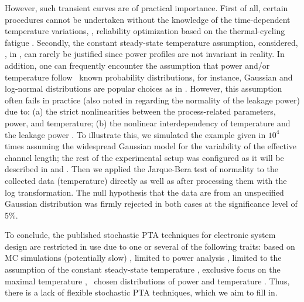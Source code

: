 However, such transient curves are of practical importance.
First of all, certain procedures cannot be undertaken without the knowledge of the time-dependent temperature variations, \eg, reliability optimization based on the thermal-cycling fatigue \cite{ukhov2012}.
Secondly, the constant steady-state temperature assumption, considered, \eg, in \cite{juan2011, juan2012}, can rarely be justified since power profiles are not invariant in reality.
In addition, one can frequently encounter the assumption that power and/or temperature follow \apriori\ known probability distributions, for instance, Gaussian and log-normal distributions are popular choices as in \cite{srivastava2010, juan2012, bhardwaj2006}.
However, this assumption often fails in practice (also noted in \cite{juan2012} regarding the normality of the leakage power) due to: (a) the strict nonlinearities between the process-related parameters, power, and temperature; (b) the nonlinear interdependency of temperature and the leakage power \cite{liu2007}.
To illustrate this, we simulated the example given in  $10^4$ times assuming the widespread Gaussian model for the variability of the effective channel length; the rest of the experimental setup was configured as it will be described in  and .
Then we applied the Jarque-Bera test of normality to the collected data (temperature) directly as well as after processing them with the log transformation.
The null hypothesis that the data are from an unspecified Gaussian distribution was firmly rejected in both cases at the significance level of 5\%.

To conclude, the published stochastic PTA techniques for electronic system design are restricted in use due to one or several of the following traits: based on MC simulations (potentially slow) \cite{chandra2010}, limited to power analysis \cite{chandra2010, shen2009, bhardwaj2006, ghanta2006}, limited to the assumption of the constant steady-state temperature \cite{juan2011, juan2012}, exclusive focus on the maximal temperature \cite{juan2011}, \apriori\ chosen distributions of power and temperature \cite{srivastava2010, juan2012, bhardwaj2006}.
Thus, there is a lack of flexible stochastic PTA techniques, which we aim to fill in.
